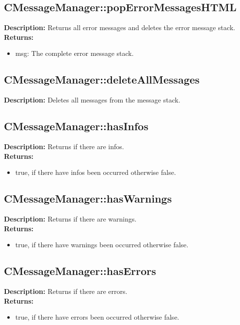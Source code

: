 \subsection{CMessageManager::popErrorMessagesHTML}
\textbf{Description:} Returns all error messages and deletes the error message stack.\\
\textbf{Returns:}
\begin{itemize}
\item msg: The complete error message stack.
\end{itemize}

\subsection{CMessageManager::deleteAllMessages}
\textbf{Description:} Deletes all messages from the message stack.\\

\subsection{CMessageManager::hasInfos}
\textbf{Description:} Returns if there are infos.\\
\textbf{Returns:}
\begin{itemize}
\item true, if there have infos been occurred otherwise false.
\end{itemize}

\subsection{CMessageManager::hasWarnings}
\textbf{Description:} Returns if there are warnings.\\
\textbf{Returns:}
\begin{itemize}
\item true, if there have warnings been occurred otherwise false.
\end{itemize}

\subsection{CMessageManager::hasErrors}
\textbf{Description:} Returns if there are errors.\\
\textbf{Returns:}
\begin{itemize}
\item true, if there have errors been occurred otherwise false.
\end{itemize}

